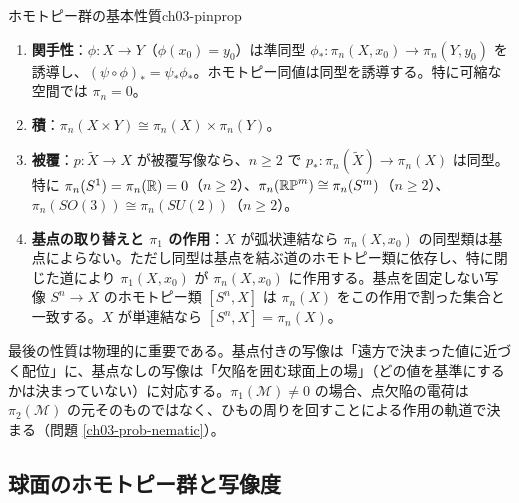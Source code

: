 \begin{myprop}{ホモトピー群の基本性質}{ch03-pinprop}
\begin{enumerate}
\item \textbf{関手性}：$\phi\colon X\to Y$（$\phi(x_0)=y_0$）は準同型 $\phi_*\colon\pi_n(X,x_0)\to\pi_n(Y,y_0)$ を誘導し、$(\psi\circ\phi)_*=\psi_*\phi_*$。ホモトピー同値は同型を誘導する。特に可縮な空間では $\pi_n=0$。
\item \textbf{積}：$\pi_n(X\times Y)\cong\pi_n(X)\times\pi_n(Y)$。
\item \textbf{被覆}：$p\colon\tilde X\to X$ が被覆写像なら、$n\ge2$ で $p_*\colon\pi_n(\tilde X)\to\pi_n(X)$ は同型。特に $\pi_n(S^1)=\pi_n(\mathbb{R})=0$（$n\ge2$）、$\pi_n(\mathbb{RP}^m)\cong\pi_n(S^m)$（$n\ge2$）、$\pi_n(SO(3))\cong\pi_n(SU(2))$（$n\ge2$）。
\item \textbf{基点の取り替えと $\pi_1$ の作用}：$X$ が弧状連結なら $\pi_n(X,x_0)$ の同型類は基点によらない。ただし同型は基点を結ぶ道のホモトピー類に依存し、特に閉じた道により $\pi_1(X,x_0)$ が $\pi_n(X,x_0)$ に作用する。基点を固定しない写像 $S^n\to X$ のホモトピー類 $[S^n,X]$ は $\pi_n(X)$ をこの作用で割った集合と一致する。$X$ が単連結なら $[S^n,X]=\pi_n(X)$。
\end{enumerate}
\end{myprop}
最後の性質は物理的に重要である。基点付きの写像は「遠方で決まった値に近づく配位」に、基点なしの写像は「欠陥を囲む球面上の場」（どの値を基準にするかは決まっていない）に対応する。$\pi_1(\mathcal M)\neq0$ の場合、点欠陥の電荷は $\pi_2(\mathcal M)$ の元そのものではなく、ひもの周りを回すことによる作用の軌道で決まる（問題 \ref{ch03-prob-nematic}）。

\subsection{球面のホモトピー群と写像度}

